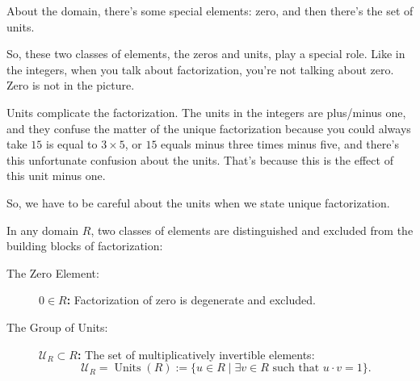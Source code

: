\begin{speech}[00:06:03 - 00:06:58]
About the domain, there's some special elements: zero,  and then there's the set of units. 

So, these two classes of elements, the zeros and units, play a special role. Like in the integers, when you talk about factorization, you're not talking about zero. Zero is not in the picture.

Units complicate the factorization. The units in the integers are plus/minus one, and they confuse the matter of the unique factorization because you could always take $15$  is equal to $3 \times 5$, or $15$ equals minus three  times minus five, and there's this unfortunate confusion about the units. That's because this is the effect of this unit minus one. 

So, we have to be careful about the units when we state unique factorization.
\end{speech}

\begin{content}
\end{content}

\begin{content}
In any domain $R$, two classes of elements are distinguished and excluded from the building blocks of factorization:
\begin{description}
    \item[The Zero Element:] \textbf{$0 \in R$:} Factorization of zero is degenerate and excluded.
    \item[The Group of Units:] \textbf{$\mathcal{U}_R \subset R$:} The set of multiplicatively invertible elements:
    \begin{equation}\label{eq:units-def}
    \mathcal{U}_R = \operatorname{Units}(R) := \{ u \in R \mid \exists v \in R \text{ such that } u \cdot v = 1 \}.
    \end{equation}
\end{description}

\end{content}

